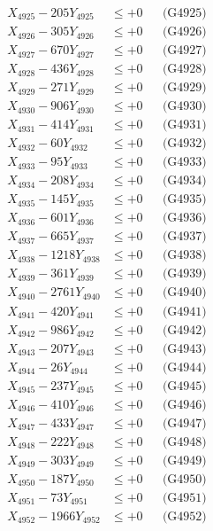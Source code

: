 \documentclass[a4paper,10pt]{article}
\begin{document}
{\begin{align}
X_{4925} - 205Y_{4925} &\leq +0 && \text{(G4925)} \\
X_{4926} - 305Y_{4926} &\leq +0 && \text{(G4926)} \\
X_{4927} - 670Y_{4927} &\leq +0 && \text{(G4927)} \\
X_{4928} - 436Y_{4928} &\leq +0 && \text{(G4928)} \\
X_{4929} - 271Y_{4929} &\leq +0 && \text{(G4929)} \\
X_{4930} - 906Y_{4930} &\leq +0 && \text{(G4930)} \\
\allowbreak
X_{4931} - 414Y_{4931} &\leq +0 && \text{(G4931)} \\
X_{4932} - 60Y_{4932} &\leq +0 && \text{(G4932)} \\
X_{4933} - 95Y_{4933} &\leq +0 && \text{(G4933)} \\
X_{4934} - 208Y_{4934} &\leq +0 && \text{(G4934)} \\
X_{4935} - 145Y_{4935} &\leq +0 && \text{(G4935)} \\
X_{4936} - 601Y_{4936} &\leq +0 && \text{(G4936)} \\
X_{4937} - 665Y_{4937} &\leq +0 && \text{(G4937)} \\
X_{4938} - 1218Y_{4938} &\leq +0 && \text{(G4938)} \\
X_{4939} - 361Y_{4939} &\leq +0 && \text{(G4939)} \\
X_{4940} - 2761Y_{4940} &\leq +0 && \text{(G4940)} \\
\allowbreak
X_{4941} - 420Y_{4941} &\leq +0 && \text{(G4941)} \\
X_{4942} - 986Y_{4942} &\leq +0 && \text{(G4942)} \\
X_{4943} - 207Y_{4943} &\leq +0 && \text{(G4943)} \\
X_{4944} - 26Y_{4944} &\leq +0 && \text{(G4944)} \\
X_{4945} - 237Y_{4945} &\leq +0 && \text{(G4945)} \\
X_{4946} - 410Y_{4946} &\leq +0 && \text{(G4946)} \\
X_{4947} - 433Y_{4947} &\leq +0 && \text{(G4947)} \\
X_{4948} - 222Y_{4948} &\leq +0 && \text{(G4948)} \\
X_{4949} - 303Y_{4949} &\leq +0 && \text{(G4949)} \\
X_{4950} - 187Y_{4950} &\leq +0 && \text{(G4950)} \\
\allowbreak
X_{4951} - 73Y_{4951} &\leq +0 && \text{(G4951)} \\
X_{4952} - 1966Y_{4952} &\leq +0 && \text{(G4952)} \\

\end{align}}
\end{document}
